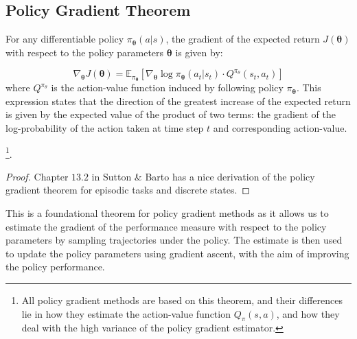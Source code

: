 
\subsection{Policy Gradient Theorem}
\begin{theorem}
For any differentiable policy $\pi_{\boldsymbol{\theta}}(a|s)$, the gradient of the expected return $J(\boldsymbol{\theta})$ with respect to the policy parameters $\boldsymbol{\theta}$ is given by:

\[
\nabla_{\boldsymbol{\theta}} J(\boldsymbol{\theta}) = \mathbb{E}_{\pi_{\boldsymbol{\theta}}}\left[ \nabla_{\boldsymbol{\theta}} \log \pi_{\boldsymbol{\theta}}(a_t|s_t) \cdot Q^{\pi_{\theta}}(s_t,a_t) \right]
\]
where $Q^{\pi_{\theta}}$ is the action-value function induced by following policy $\pi_{\boldsymbol{\theta}}$. This expression states that the direction of the greatest increase of the expected return is given by the expected value of the product of two terms: the gradient of the log-probability of the action taken at time step $t$ and corresponding action-value. 

\footnote{All policy gradient methods are based on this theorem, and their differences lie in how they estimate the action-value function $Q_{\pi}(s, a)$, and how they deal with the high variance of the policy gradient estimator.}. 
\end{theorem}
\begin{proof}
    Chapter $13.2$ in Sutton \& Barto has a nice derivation of the policy gradient theorem for episodic tasks and discrete states.
\end{proof}

This is a foundational theorem for policy gradient methods as it allows us to estimate the gradient of the performance measure with respect to the policy parameters by sampling trajectories under the policy. The estimate is then used to update the policy parameters using gradient ascent, with the aim of improving the policy performance.

